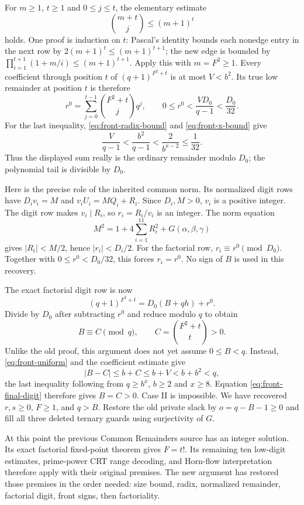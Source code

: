 \documentclass[11pt,letterpaper]{article}
\theoremstyle{definition}
\theoremstyle{remark}
\begin{document}
For $m\geq1$, $t\geq1$ and $0\leq j\leq t$, the elementary estimate
\begin{equation}
 \binom{m+t}{j}\leq(m+1)^t
 \label{eq:front-binomial-bound}
\end{equation}
holds.  One proof is induction on $t$: Pascal's identity bounds each
nonedge entry in the next row by $2(m+1)^t\leq(m+1)^{t+1}$; the new
edge is bounded by
$\prod_{i=1}^{t+1}(1+m/i)\leq(m+1)^{t+1}$.
Apply this with $m=F^2\geq1$.  Every coefficient through position $t$
of $(q+1)^{F^2+t}$ is at most $V<b^2$.  Its true low remainder at
position $t$ is therefore
\[
 r^0=\sum_{j=0}^{t-1}\binom{F^2+t}{j}q^j,
 \qquad
 0\leq r^0<\frac{V D_0}{q-1}<\frac{D_0}{32}.
\]
For the last inequality, \eqref{eq:front-radix-bound} and
\eqref{eq:front-x-bound} give
\[
 \frac{V}{q-1}<\frac{b^2}{q-1}
 <\frac{2}{b^{x-2}}\leq\frac1{32}.
\]
Thus the displayed sum really is the ordinary remainder modulo $D_0$;
the polynomial tail is divisible by $D_0$.

Here is the precise role of the inherited common norm.  Its normalized
digit rows have $D_i v_i=M$ and
$v_iU_i=M Q_i+R_i$.  Since $D_i,M>0$, $v_i$ is a positive integer.
The digit row makes $v_i\mid R_i$, so $r_i=R_i/v_i$ is an integer.
The norm equation
\begin{equation}
 M^2=1+4\sum_{i=1}^{11}R_i^2+G(\alpha,\beta,\gamma)
 \label{eq:front-norm}
\end{equation}
gives $|R_i|<M/2$, hence $|r_i|<D_i/2$.
For the factorial row, $r_i\equiv r^0\pmod{D_0}$.
Together with $0\leq r^0<D_0/32$, this forces $r_i=r^0$.
No sign of $B$ is used in this recovery.

The exact factorial digit row is now
\[
 (q+1)^{F^2+t}=D_0(B+qh)+r^0.
\]
Divide by $D_0$ after subtracting $r^0$ and reduce modulo $q$ to obtain
\begin{equation}
 B\equiv C\pmod q,
 \qquad C=\binom{F^2+t}{t}>0.
 \label{eq:front-final-digit}
\end{equation}
Unlike the old proof, this argument does not yet assume $0\leq B<q$.
Instead, \eqref{eq:front-uniform} and the coefficient estimate give
\[
 |B-C|\leq b+C\leq b+V<b+b^2<q,
\]
the last inequality following from $q\geq b^x$, $b\geq2$ and $x\geq8$.
Equation \eqref{eq:front-final-digit} therefore gives $B=C>0$.
Case II is impossible.  We have recovered $r,s\geq0$, $F\geq1$,
and $q>B$.  Restore the old private slack by $o=q-B-1\geq0$ and fill
all three deleted ternary guards using surjectivity of $G$.

At this point the previous Common Remainders source has an integer
solution.  Its exact factorial fixed-point theorem gives $F=t!$.
Its remaining ten low-digit estimates, prime-power CRT range decoding,
and Horn-flow interpretation therefore apply with their original
premises.  The new argument has restored those premises in the order
needed: size bound, radix, normalized remainder, factorial digit, front
signs, then factoriality.
\end{document}

